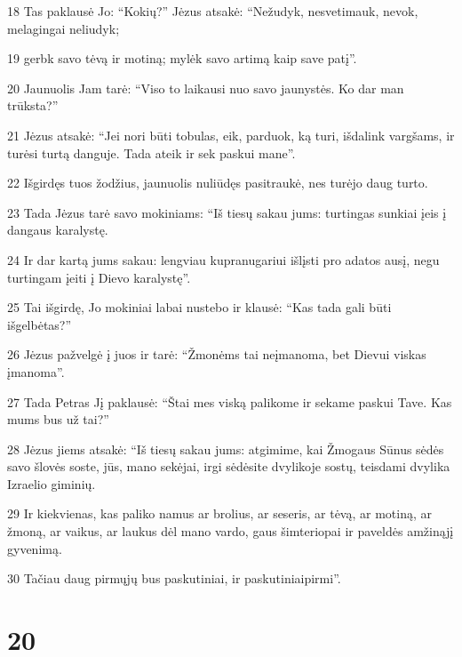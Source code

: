 \par 18 Tas paklausė Jo: “Kokių?” Jėzus atsakė: “Nežudyk, nesvetimauk, nevok, melagingai neliudyk; 
\par 19 gerbk savo tėvą ir motiną; mylėk savo artimą kaip save patį”. 
\par 20 Jaunuolis Jam tarė: “Viso to laikausi nuo savo jaunystės. Ko dar man trūksta?” 
\par 21 Jėzus atsakė: “Jei nori būti tobulas, eik, parduok, ką turi, išdalink vargšams, ir turėsi turtą danguje. Tada ateik ir sek paskui mane”. 
\par 22 Išgirdęs tuos žodžius, jaunuolis nuliūdęs pasitraukė, nes turėjo daug turto. 
\par 23 Tada Jėzus tarė savo mokiniams: “Iš tiesų sakau jums: turtingas sunkiai įeis į dangaus karalystę. 
\par 24 Ir dar kartą jums sakau: lengviau kupranugariui išlįsti pro adatos ausį, negu turtingam įeiti į Dievo karalystę”. 
\par 25 Tai išgirdę, Jo mokiniai labai nustebo ir klausė: “Kas tada gali būti išgelbėtas?” 
\par 26 Jėzus pažvelgė į juos ir tarė: “Žmonėms tai neįmanoma, bet Dievui viskas įmanoma”. 
\par 27 Tada Petras Jį paklausė: “Štai mes viską palikome ir sekame paskui Tave. Kas mums bus už tai?” 
\par 28 Jėzus jiems atsakė: “Iš tiesų sakau jums: atgimime, kai Žmogaus Sūnus sėdės savo šlovės soste, jūs, mano sekėjai, irgi sėdėsite dvylikoje sostų, teisdami dvylika Izraelio giminių. 
\par 29 Ir kiekvienas, kas paliko namus ar brolius, ar seseris, ar tėvą, ar motiną, ar žmoną, ar vaikus, ar laukus dėl mano vardo, gaus šimteriopai ir paveldės amžinąjį gyvenimą. 
\par 30 Tačiau daug pirmųjų bus paskutiniai, ir paskutiniai­pirmi”.



\chapter{20}


